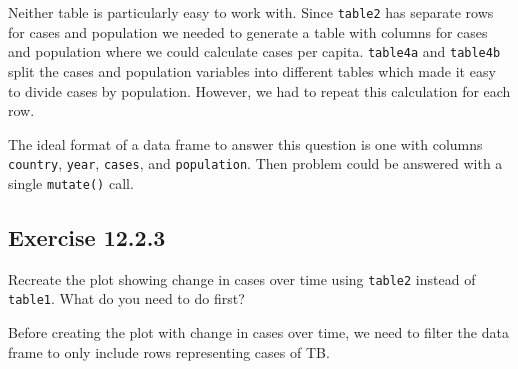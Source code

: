 \documentclass[]{book}
\newenvironment{Shaded}{\begin{snugshade}}{\end{snugshade}}
\newcommand{\CommentTok}[1]{\textcolor[rgb]{0.56,0.35,0.01}{\textit{#1}}}
\newcommand{\DataTypeTok}[1]{\textcolor[rgb]{0.13,0.29,0.53}{#1}}
\newcommand{\DecValTok}[1]{\textcolor[rgb]{0.00,0.00,0.81}{#1}}
\newcommand{\KeywordTok}[1]{\textcolor[rgb]{0.13,0.29,0.53}{\textbf{#1}}}
\newcommand{\NormalTok}[1]{#1}
\newcommand{\OperatorTok}[1]{\textcolor[rgb]{0.81,0.36,0.00}{\textbf{#1}}}
\newcommand{\StringTok}[1]{\textcolor[rgb]{0.31,0.60,0.02}{#1}}
\theoremstyle{plain}
\theoremstyle{remark}
\begin{document}
\begin{Shaded}
\end{Shaded}

Neither table is particularly easy to work with. Since \texttt{table2}
has separate rows for cases and population we needed to generate a table
with columns for cases and population where we could calculate cases per
capita. \texttt{table4a} and \texttt{table4b} split the cases and
population variables into different tables which made it easy to divide
cases by population. However, we had to repeat this calculation for each
row.

The ideal format of a data frame to answer this question is one with
columns \texttt{country}, \texttt{year}, \texttt{cases}, and
\texttt{population}. Then problem could be answered with a single
\texttt{mutate()} call.

\hypertarget{exercise-12.2.3}{%
\subsection*{\texorpdfstring{Exercise
{12.2.3}}{Exercise 12.2.3}}\label{exercise-12.2.3}}

Recreate the plot showing change in cases over time using
\texttt{table2} instead of \texttt{table1}. What do you need to do
first?

Before creating the plot with change in cases over time, we need to
filter the data frame to only include rows representing cases of TB.
\end{document}
